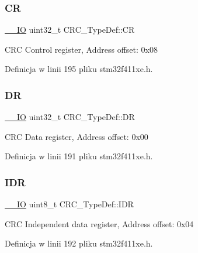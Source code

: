 \subsubsection{\texorpdfstring{CR}{CR}}
{\footnotesize\ttfamily \hyperlink{core__sc300_8h_aec43007d9998a0a0e01faede4133d6be}{\+\_\+\+\_\+\+IO} uint32\+\_\+t C\+R\+C\+\_\+\+Type\+Def\+::\+CR}

C\+RC Control register, Address offset\+: 0x08 

Definicja w linii 195 pliku stm32f411xe.\+h.

\mbox{\label{struct_c_r_c___type_def_a50cb22870dbb9001241cec694994e5ef}} 
\subsubsection{\texorpdfstring{DR}{DR}}
{\footnotesize\ttfamily \hyperlink{core__sc300_8h_aec43007d9998a0a0e01faede4133d6be}{\+\_\+\+\_\+\+IO} uint32\+\_\+t C\+R\+C\+\_\+\+Type\+Def\+::\+DR}

C\+RC Data register, Address offset\+: 0x00 

Definicja w linii 191 pliku stm32f411xe.\+h.

\mbox{\label{struct_c_r_c___type_def_ad84e8694cd4b5375ee533c2d875c3b5a}} 
\subsubsection{\texorpdfstring{I\+DR}{IDR}}
{\footnotesize\ttfamily \hyperlink{core__sc300_8h_aec43007d9998a0a0e01faede4133d6be}{\+\_\+\+\_\+\+IO} uint8\+\_\+t C\+R\+C\+\_\+\+Type\+Def\+::\+I\+DR}

C\+RC Independent data register, Address offset\+: 0x04 

Definicja w linii 192 pliku stm32f411xe.\+h.

\mbox{\label{struct_c_r_c___type_def_a70dfd1730dba65041550ef55a44db87c}} 
